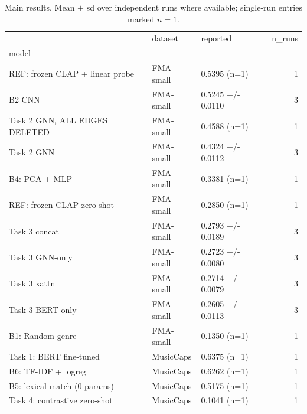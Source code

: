\begin{table}[t]
\caption{Main results. Mean $\pm$ sd over independent runs where available; single-run entries marked $n{=}1$.}
\label{tab:master2}
\begin{tabular}{lllr}
\toprule
 & dataset & reported & n\_runs \\
model &  &  &  \\
\midrule
REF: frozen CLAP + linear probe & FMA-small & 0.5395 (n=1) & 1 \\
B2 CNN & FMA-small & 0.5245 +/- 0.0110 & 3 \\
Task 2 GNN, ALL EDGES DELETED & FMA-small & 0.4588 (n=1) & 1 \\
Task 2 GNN & FMA-small & 0.4324 +/- 0.0112 & 3 \\
B4: PCA + MLP & FMA-small & 0.3381 (n=1) & 1 \\
REF: frozen CLAP zero-shot & FMA-small & 0.2850 (n=1) & 1 \\
Task 3 concat & FMA-small & 0.2793 +/- 0.0189 & 3 \\
Task 3 GNN-only & FMA-small & 0.2723 +/- 0.0080 & 3 \\
Task 3 xattn & FMA-small & 0.2714 +/- 0.0079 & 3 \\
Task 3 BERT-only & FMA-small & 0.2605 +/- 0.0113 & 3 \\
B1: Random genre & FMA-small & 0.1350 (n=1) & 1 \\
Task 1: BERT fine-tuned & MusicCaps & 0.6375 (n=1) & 1 \\
B6: TF-IDF + logreg & MusicCaps & 0.6262 (n=1) & 1 \\
B5: lexical match (0 params) & MusicCaps & 0.5175 (n=1) & 1 \\
Task 4: contrastive zero-shot & MusicCaps & 0.1041 (n=1) & 1 \\
\bottomrule
\end{tabular}
\end{table}
